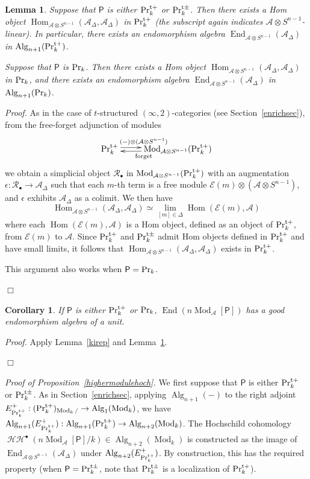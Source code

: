 \documentclass[leqno,12pt]{amsart}
\theoremstyle{plain}
\newtheorem{Lemma}[Theorem]{Lemma}
\newtheorem{Corollary}[Theorem]{Corollary}
\theoremstyle{definition}
\newcommand{\HH}{\operatorname{\mathcal{HH}}}
\newcommand{\AAA}{\mathcal{A}}
\newcommand{\PR}{\textup{Pr}}
\newcommand{\PRTT}{\textup{Pr}^{\textup{t}+}}
\newcommand{\PRTTT}{\textup{Pr}^{\textup{t}\pm}}
\newcommand{\Hom}{\operatorname{Hom}}
\newcommand{\Mod}{\operatorname{Mod}}
\newcommand{\Alg}{\operatorname{Alg}}
\newcommand{\End}{\operatorname{End}}
\newcommand{\Proof}{{\sl Proof.}\quad}
\newcommand{\QED}{{\unskip\nobreak\hfil\penalty50\quad\null\nobreak\hfil
{$\Box$}\parfillskip0pt\finalhyphendemerits0\par\medskip}}
\begin{document}
\begin{Lemma}
\label{higherendo}
Suppose that $\mathsf{P}$ is either $\PRTT_k$ or $\PRTTT_k$.
Then there exists a Hom object $\Hom_{\AAA\otimes S^{n-1}}(\AAA_{\Delta},\AAA_{\Delta})$ in $\PRTT_k$ (the subscript again indicates $\AAA\otimes S^{n-1}$-linear).
In particular, there exists an endomorphism algebra $\End_{\AAA\otimes S^{n-1}}(\AAA_{\Delta})$ in $\Alg_{n+1}(\PRTT_k)$.

Suppose that $\mathsf{P}$ is $\PR_k$. 
Then there exists a Hom object $\Hom_{\AAA\otimes S^{n-1}}(\AAA_{\Delta},\AAA_{\Delta})$ in $\PR_k$,
and there exists an endomorphism algebra $\End_{\AAA\otimes S^{n-1}}(\AAA_{\Delta})$ in $\Alg_{n+1}(\PR_k)$.
\end{Lemma}

\Proof
As in the case of $t$-structured $(\infty,2)$-categories (see Section~\ref{enrichsec}),  from the free-forget adjunction of modules
\[
\xymatrix{
\PRTT_k \ar@<0.5ex>[r]^{(-)\otimes(\AAA\otimes S^{n-1})}  &  \Mod_{\AAA\otimes S^{n-1}}(\PRTT_k)   \ar@<0.5ex>[l]^{\textup{forget}}  
}
\]
we obtain a simplicial object $\mathcal{R}_\bullet$ in $\Mod_{\AAA\otimes S^{n-1}}(\PRTT_k)$ with an augmentation $\epsilon:\mathcal{R}_\bullet\to \mathcal{A}_{\Delta}$ 
such that each $m$-th term is a free module $\mathcal{E}(m)\otimes (\mathcal{A}\otimes S^{n-1})$,
and $\epsilon$ exhibits $\mathcal{A}_{\Delta}$ as a colimit.
We then have
\[
\Hom_{\AAA\otimes S^{n-1}}(\AAA_{\Delta},\AAA_{\Delta})\simeq \lim_{[m]\in \Delta}\Hom(\mathcal{E}(m),\AAA)
\]
where each $\Hom(\mathcal{E}(m),\AAA)$ is a Hom object, defined as an object of $\PRTT_k$,
from $\mathcal{E}(m)$ to $\AAA$. Since $\PRTT_k$ and $\PRTTT_k$ admit Hom objects defined in $\PRTT_k$ and have small limits,
it follows that $\Hom_{\AAA\otimes S^{n-1}}(\AAA_{\Delta},\AAA_{\Delta})$ exists in $\PRTT_k$.

This argument also works when $\mathsf{P}=\PR_k$.
\QED



\begin{Corollary}
\label{goodendohighermodule}
If $\mathsf{P}$ is either $\PRTT_k$ or $\PR_k$,
$\End(n\Mod_{\AAA}[\mathsf{P}])$ has a good endomorphism algebra of a unit.
\end{Corollary}


\Proof
Apply Lemma~\ref{kirep} and Lemma~\ref{higherendo}.
\QED


{\it Proof of Proposition~\ref{highermodulehoch}.}
We first suppose that $\mathsf{P}$ is either $\PRTT_k$ or $\PRTTT_k$.
As in Section~\ref{enrichsec},
applying $\Alg_{n+1}(-)$ to the right adjoint $E^+_{\PRTT_k}:(\PRTT_k)_{\Mod_k/}\to \Alg_1(\Mod_k)$, we have
$\Alg_{n+1}(E^+_{\PRTT_k}):\Alg_{n+1}(\PRTT_k)\to \Alg_{n+2}(\Mod_k)$.
The Hochschild cohomology $\HH^\bullet(n\Mod_{\AAA}[\mathsf{P}]/k)\in \Alg_{n+2}(\Mod_k)$ is constructed as the image of $\End_{\AAA\otimes S^{n-1}}(\AAA_{\Delta})$  under
$\Alg_{n+2}(E^+_{\PRTT_k})$. By construction, this has the required property (when $\mathsf{P}=\PRTTT_k$, note that $\PRTTT_k$ is a localization of $\PRTT_k$).
\end{document}
